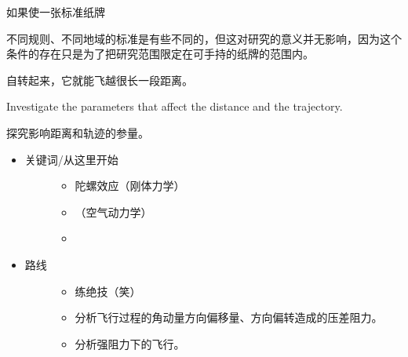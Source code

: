 \documentclass[a4paper,10pt,english]{sphinxmanual}
\begin{document}
如果使一张标准纸牌 %
\begin{footnote}[13]\sphinxAtStartFootnote
不同规则、不同地域的标准是有些不同的，但这对研究的意义并无影响，因为这个条件的存在只是为了把研究范围限定在可手持的纸牌的范围内。
%
\end{footnote} 自转起来，它就能飞越很长一段距离。

Investigate the parameters that affect the distance and the trajectory.

探究影响距离和轨迹的参量。
\begin{itemize}
\item {} \begin{description}
\item[{关键词/从这里开始}] \leavevmode\begin{itemize}
\item {} 
陀螺效应（刚体力学）

\item {} 
 （空气动力学）

\item {} 

\end{itemize}

\end{description}

\item {} \begin{description}
\item[{路线}] \leavevmode\begin{itemize}
\item {} 
练绝技（笑）

\item {} 
分析飞行过程的角动量方向偏移量、方向偏转造成的压差阻力。

\item {} 
分析强阻力下的飞行。

\end{itemize}

\end{description}

\end{itemize}
\end{document}
